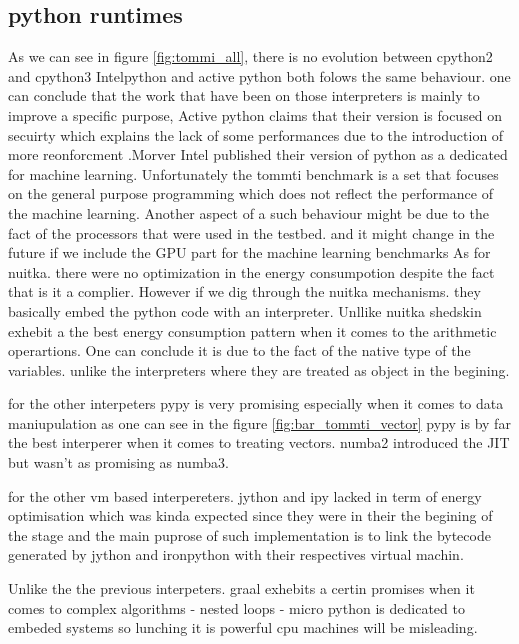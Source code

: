 \subsection{python runtimes}

As we can see in figure \ref{fig:tommi_all}, there is no evolution between cpython2 and cpython3
Intelpython and active python both folows the same behaviour. one can conclude that the work that have been on those interpreters is mainly
to improve a specific purpose, Active python claims that their version is focused on secuirty which explains the lack of some performances due to the introduction of more reonforcment
.Morver Intel published their version of python as a dedicated for machine learning. Unfortunately the tommti benchmark is a set that focuses on the general purpose programming
which does not reflect the performance of the machine learning.
Another aspect of a such behaviour might be due to the fact of the processors that were used in the testbed. and it might change in the future if we include the GPU part for the machine learning benchmarks
As for nuitka. there were no optimization in the energy consumpotion despite the fact that is it a complier.
However if we dig through the nuitka mechanisms. they basically embed the python code with an interpreter.
Unllike nuitka shedskin exhebit a the best energy consumption pattern when it comes to the arithmetic operartions. One can conclude it is due to the fact of the native type of the variables. unlike the interpreters where they are treated as object in the begining.

for the other interpeters pypy is very promising especially when it comes to data maniupulation as one can see in the figure \ref{fig:bar_tommti_vector}
pypy is by far the best interperer when it comes to treating vectors.
numba2 introduced the JIT but wasn't as promising as numba3.

for the other vm based interpereters. jython and ipy lacked in term of energy optimisation which was kinda expected since they were in their the begining of the stage and the main puprose of such implementation is to link the bytecode generated by jython and ironpython with their respectives virtual machin.

Unlike the the previous interpeters. graal exhebits a certin promises when it comes to complex algorithms - nested loops -
micro python is dedicated to embeded systems so lunching it is powerful cpu machines will be misleading.

